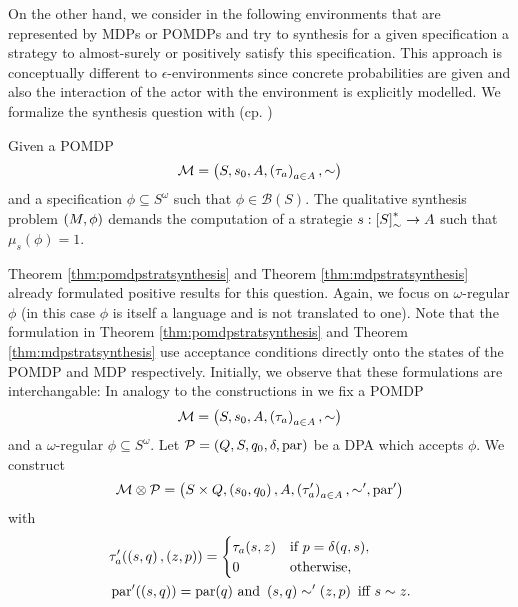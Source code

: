 On the other hand, we consider in the following environments that are
represented by \acp{MDP} or \acp{POMDP} and try to synthesis for a given
specification a strategy to almost-surely or positively satisfy this
specification. This approach is conceptually different to
$\epsilon$-environments since concrete probabilities are given and also the
interaction of the actor with the environment is explicitly modelled. We
formalize the synthesis question with (cp. \cite{QualAnaPOMDP,%
SimpleStochasticParityGames, ComplexProbVerification})
\begin{definition}
  Given a \ac{POMDP}
  \begin{equation*}
    \mathcal{M} = \left(S, s_{0}, A, \left(\tau_{a}\right)_{a\in A}, \sim\right)
  \end{equation*}
  and a specification $\phi\subseteq S^{\omega}$ such that
  $\phi\in\mathcal{B}(S)$. The qualitative synthesis problem
  $\left(M, \phi\right)$ demands the computation of a strategie
  $s:\left[S\right]_{\sim}^{*}\rightarrow A$ such that $\mu_{s}(\phi) = 1$.
\end{definition}
Theorem \ref{thm:pomdpstratsynthesis} and Theorem \ref{thm:mdpstratsynthesis}
already formulated positive results for this question. Again, we focus on
$\omega$-regular $\phi$ (in this case $\phi$ is itself a language
and is not translated to one). Note that the formulation in Theorem 
\ref{thm:pomdpstratsynthesis} and Theorem \ref{thm:mdpstratsynthesis} use 
acceptance conditions directly onto the states of the \ac{POMDP} and \ac{MDP}
respectively. Initially, we observe that these formulations are interchangable:
In analogy to the constructions in \cite{ComplexProbVerification,%
MDPandRegEvents} we fix a \ac{POMDP}
\begin{equation*}
  \mathcal{M} = \left(S, s_{0}, A, \left(\tau_{a}\right)_{a\in A}, \sim\right)
\end{equation*}
and a $\omega$-regular $\phi\subseteq S^{\omega}$. Let
$\mathcal{P} = \left(Q, S, q_{0}, \delta, \operatorname{par}\right)$ be a \ac{DPA} which
accepts $\phi$. We construct
\begin{equation*}
  \mathcal{M}\otimes\mathcal{P} = \left(S\times Q, \left(s_{0}, q_{0}\right), A, 
  \left(\tau'_{a}\right)_{a\in A}, \sim', \operatorname{par}'\right)
\end{equation*}
with
\begin{align*}
  &\tau'_{a}(\left(s, q\right), \left(z, p\right)) = \begin{cases}
    \tau_{a}(s, z)&\text{if }p = \delta(q,s),\\
    0&\text{otherwise,}
  \end{cases}\\
  &\operatorname{par}'(\left(s,q\right)) = \operatorname{par}(q)
  \text{ and }
  \left(s, q\right)\sim'\left(z, p\right)\text{ iff }s\sim z.
\end{align*}
